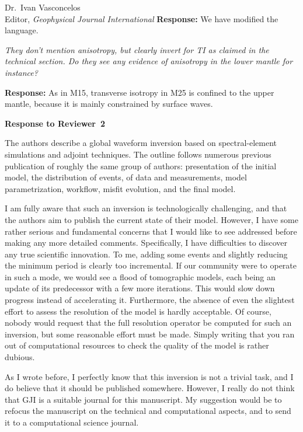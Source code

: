 \documentclass[11pt,a4paper]{letter}
\newcommand{\response}[1]{\textbf{Response:} #1}
\newcommand{\rev}[1]{{\it{#1}}}
\begin{document}
\begin{letter}{Dr.~Ivan Vasconcelos\\
Editor, \textit{Geophysical Journal International}}
\response{We have modified the language.}

\rev{They don't mention anisotropy, but clearly invert for TI as claimed in the technical section. Do they see any evidence of anisotropy in the lower mantle for instance?
}

\response{As in M15, transverse isotropy in M25 is confined to the upper mantle, because it is mainly constrained by surface waves. }

{\textbf{\large{Response to Reviewer~2}}}

\rev{The authors describe a global waveform inversion based on spectral-element simulations and adjoint techniques. The outline follows numerous previous publication of roughly the same group of authors: presentation of the initial model, the distribution of events, of data and measurements, model parametrization, workflow, misfit evolution, and the final model. 

I am fully aware that such an inversion is technologically challenging, and that the authors aim to publish the current state of their model. However, I have some rather serious and fundamental concerns that I would like to see addressed before making any more detailed comments. Specifically, I have difficulties to discover any true scientific innovation. To me, adding some events and slightly reducing the minimum period is clearly too incremental. If our community were to operate in such a mode, we would see a flood of tomographic models, each being an update of its predecessor with a few more iterations. This would slow down progress instead of accelerating it. Furthermore, the absence of even the slightest effort to assess the resolution of the model is hardly acceptable. Of course, nobody would request that the full resolution operator be computed for such an inversion, but some reasonable effort must be made. Simply writing that you ran out of computational resources to check the quality of the model is rather dubious.

As I wrote before, I perfectly know that this inversion is not a trivial task, and I do believe that it should be published somewhere. However, I really do not think that GJI is a suitable journal for this manuscript. My suggestion would be to refocus the manuscript on the technical and computational aspects, and to send it to a computational science journal.
}


\end{letter}
\end{document}
